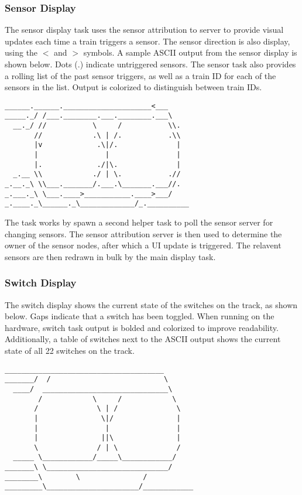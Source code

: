 \documentclass[twoside,a4paper]{refart}
\begin{document}
\subsubsection{Sensor Display}

The sensor display task uses the sensor attribution to server to provide visual updates each time a train triggers a sensor. The sensor direction is also display, using the $<$ and $>$ symbols. A sample ASCII output from the sensor display is shown below. Dots ($.$) indicate untriggered sensors. The sensor task also provides a rolling list of the past sensor triggers, as well as a train ID for each of the sensors in the list. Output is colorized to distinguish between train IDs.

\begin{verbatim}
______.______._____________________<___    
_____._/ /___.________.___.________.___\ 
  __._/ //           \     /           \\.
       //            .\ | /.           .\\ 
       |v             .\|/.              |  
       |                |                |   
       |.             ./|\.              |   
  _.__ \\            ./ | \.           .// 
_.__._\ \\___._______/.___.\_______.___//.
_.___._\ \___.____>___________.____>___/  
_.____._\______._\_____________/_.__________
\end{verbatim}

The task works by spawn a second helper task to poll the sensor server for changing sensors. The sensor attribution server is then used to determine the owner of the sensor nodes, after which a UI update is triggered. The relavent sensors are then redrawn in bulk by the main display task.

\subsubsection{Switch Display}
The switch display shows the current state of the switches on the track, as shown below. Gaps indicate that a switch has been toggled. When running on the hardware, switch task output is bolded and colorized to improve readability. Additionally, a table of switches next to the ASCII output shows the current state of all 22 switches on the track.

\begin{verbatim}
______________________________________
_______/  /                           \
  ____/  ______________________________\
        /            \     /            \
       /              \ | /              \
       |               \|/               |
       |                |                |
       |               ||\               |
       \              / | \              /
  _____ \____________/_____\____________/
_______\ \_____________________________/
________\        \               /
_________\______________________/____________
\end{verbatim}
\end{document}

